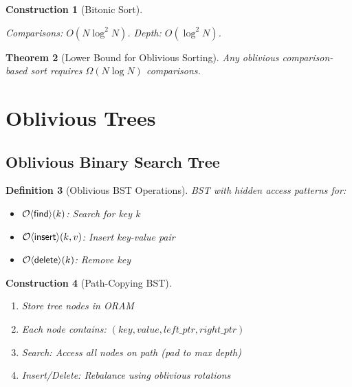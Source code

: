 \documentclass[11pt,final]{article}
\newcommand{\Insert}{\mathsf{insert}}
\newcommand{\Delete}{\mathsf{delete}}
\newcommand{\Find}{\mathsf{find}}
\newtheorem{theorem}{Theorem}[section]
\newtheorem{definition}[theorem]{Definition}
\newtheorem{construction}[theorem]{Construction}
\begin{document}
\begin{construction}[Bitonic Sort]
\begin{algorithm}[H]
\caption{Bitonic Sort (Oblivious)}
\end{algorithm}
Comparisons: $O(N \log^2 N)$. Depth: $O(\log^2 N)$.
\end{construction}

\begin{theorem}[Lower Bound for Oblivious Sorting]
Any oblivious comparison-based sort requires $\Omega(N \log N)$ comparisons.
\end{theorem}

\section{Oblivious Trees}

\subsection{Oblivious Binary Search Tree}

\begin{definition}[Oblivious BST Operations]
BST with hidden access patterns for:
\begin{itemize}
    \item $\Obv{\Find}(k)$: Search for key $k$
    \item $\Obv{\Insert}(k, v)$: Insert key-value pair
    \item $\Obv{\Delete}(k)$: Remove key
\end{itemize}
\end{definition}

\begin{construction}[Path-Copying BST]
\begin{enumerate}
    \item Store tree nodes in ORAM
    \item Each node contains: $(key, value, left\_ptr, right\_ptr)$
    \item Search: Access all nodes on path (pad to max depth)
    \item Insert/Delete: Rebalance using oblivious rotations
\end{enumerate}
\end{construction}
\end{document}
